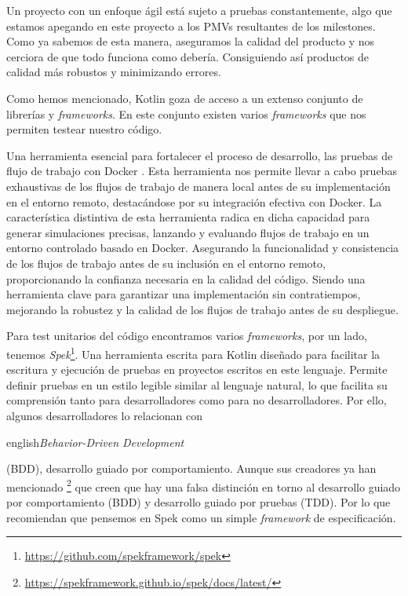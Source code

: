 Un proyecto con un enfoque ágil está sujeto a pruebas constantemente, algo que estamos apegando en este 
proyecto a los PMVs resultantes de los milestones. Como ya sabemos de esta manera, aseguramos la 
calidad del producto y nos cerciora de que todo funciona como debería. Consiguiendo así productos de 
calidad más robustos y minimizando errores.

Como hemos mencionado, Kotlin goza de acceso a un extenso conjunto de librerías y \textit{frameworks}. 
En este conjunto existen varios \textit{frameworks} que nos permiten testear nuestro código.

Una herramienta esencial para fortalecer el proceso de desarrollo, las pruebas de flujo de trabajo con Docker 
\cite{GI_act}. Esta herramienta nos permite llevar a cabo pruebas exhaustivas de los flujos de trabajo de manera 
local antes de su implementación en el entorno remoto, destacándose por su integración efectiva con Docker. La 
característica distintiva de esta herramienta radica en dicha capacidad para generar simulaciones precisas, 
lanzando y evaluando flujos de trabajo en un entorno controlado basado en Docker. Asegurando la funcionalidad y 
consistencia de los flujos de trabajo antes de su inclusión en el entorno remoto, proporcionando la confianza 
necesaria en la calidad del código. Siendo una herramienta clave para garantizar una implementación sin 
contratiempos, mejorando la robustez y la calidad de los flujos de trabajo antes de su despliegue.

Para test unitarios del código encontramos varios \textit{frameworks}, por un lado, tenemos 
\textit{Spek}\footnote{\url{https://github.com/spekframework/spek}}. Una herramienta escrita para 
Kotlin diseñado para facilitar la escritura y ejecución de pruebas en proyectos escritos en este 
lenguaje. Permite definir pruebas en un estilo legible similar al lenguaje natural, lo que facilita 
su comprensión tanto para desarrolladores como para no desarrolladores. Por ello, algunos 
desarrolladores lo relacionan con \begin{otherlanguage}
{english}\textit{Behavior-Driven Development}\end{otherlanguage} (BDD), desarrollo guiado por 
comportamiento. Aunque sus creadores ya han mencionado 
\footnote{\url{https://spekframework.github.io/spek/docs/latest/}} que creen que hay una falsa 
distinción en torno al desarrollo guiado por comportamiento (BDD) y desarrollo guiado por pruebas 
(TDD). Por lo que recomiendan que pensemos en Spek como un simple \textit{framework} de 
especificación.


